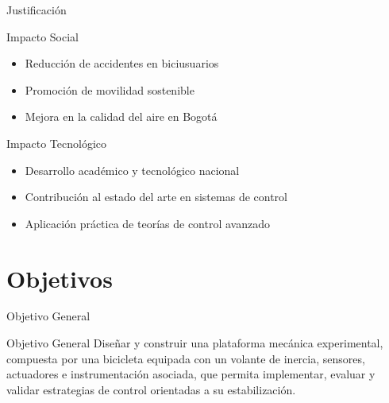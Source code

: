\documentclass[10pt,xcolor={dvipsnames}]{beamer}
\begin{document}
\begin{frame}{Justificación}
\begin{block}{Impacto Social}
\begin{itemize}
    \item Reducción de accidentes en biciusuarios
    \item Promoción de movilidad sostenible
    \item Mejora en la calidad del aire en Bogotá
\end{itemize}
\end{block}

\begin{block}{Impacto Tecnológico}
\begin{itemize}
    \item Desarrollo académico y tecnológico nacional
    \item Contribución al estado del arte en sistemas de control
    \item Aplicación práctica de teorías de control avanzado
\end{itemize}
\end{block}

\vspace{0.3cm}
\begin{center}
\end{center}
\end{frame}

\section{Objetivos}

\begin{frame}{Objetivo General}
\begin{block}{Objetivo General}
Diseñar y construir una plataforma mecánica experimental, compuesta por una bicicleta equipada con un volante de inercia, sensores, actuadores e instrumentación asociada, que permita implementar, evaluar y validar estrategias de control orientadas a su estabilización.
\end{block}

\vspace{0.3cm}
\begin{center}
\end{center}
\end{frame}
\end{document}
